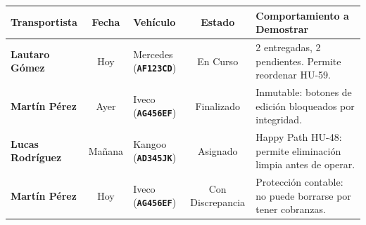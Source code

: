 \documentclass[a4paper,9pt]{article}
\newcommand{\codeb}[1]{\texttt{\bfseries #1}}
\begin{document}
\begin{tcolorbox}[cardheader, title={\small Resumen de Itinerarios Sembrados en el Sistema para Validación Visual}, top=2pt, bottom=2pt]
{\scriptsize
\begin{tabularx}{\textwidth}{@{}l c l c X@{}}
\textbf{Transportista} & \textbf{Fecha} & \textbf{Vehículo} & \textbf{Estado} & \textbf{Comportamiento a Demostrar} \\
\midrule
\textbf{Lautaro Gómez} & Hoy & Mercedes (\codeb{AF123CD}) & En Curso & 2 entregadas, 2 pendientes. Permite reordenar HU-59. \\
\textbf{Martín Pérez} & Ayer & Iveco (\codeb{AG456EF}) & Finalizado & Inmutable: botones de edición bloqueados por integridad. \\
\textbf{Lucas Rodríguez} & Mañana & Kangoo (\codeb{AD345JK}) & Asignado & Happy Path HU-48: permite eliminación limpia antes de operar. \\
\textbf{Martín Pérez} & Hoy & Iveco (\codeb{AG456EF}) & Con Discrepancia & Protección contable: no puede borrarse por tener cobranzas. \\
\end{tabularx}}
\end{tcolorbox}

\newpage

\end{document}
